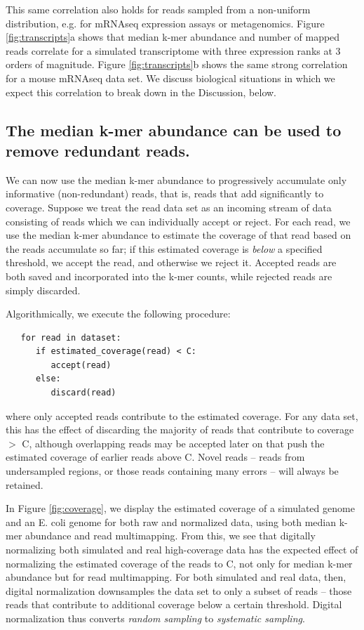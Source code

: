 \documentclass[10pt]{article}
\begin{document}
This same correlation also holds for reads sampled from a non-uniform
distribution, e.g. for mRNAseq expression assays or metagenomics.
Figure \ref{fig:transcripts}a shows that median k-mer abundance and number of mapped reads
correlate for a simulated transcriptome with three expression ranks at 3
orders of magnitude.  Figure \ref{fig:transcripts}b shows the same strong correlation
for a mouse mRNAseq data set.  We discuss biological situations in which
we expect this correlation to break down in the Discussion, below.

\subsection*{The median k-mer abundance can be used to remove redundant reads.}

We can now use the median k-mer abundance to progressively accumulate only
informative (non-redundant) reads, that is, reads that add significantly to 
coverage.  Suppose we treat the
read data set as an incoming stream of data consisting of reads which
we can individually accept or reject.  For each read, we
use the median k-mer abundance to estimate the coverage of that read based on the reads
accumulate so far; if this estimated coverage is {\em below} a specified threshold, we
accept the read, and otherwise we reject it.  Accepted reads are both
saved and incorporated into the k-mer counts, while rejected reads are
simply discarded.

Algorithmically, we execute the following procedure:

\begin{verbatim}
   for read in dataset:
      if estimated_coverage(read) < C:
         accept(read)
      else:
         discard(read)
\end{verbatim}

where only accepted reads contribute to the estimated coverage.  For
any data set, this has the effect of discarding the majority of reads
that contribute to coverage $>$ C, although overlapping reads may be
accepted later on that push the estimated coverage of earlier reads
above C.  Novel reads -- reads from undersampled regions, or those
reads containing many errors -- will always be retained.

In Figure \ref{fig:coverage}, we display the estimated coverage of a simulated genome
and an E. coli genome for both raw and normalized data, using both
median k-mer abundance and read multimapping.  From this, we see that
digitally normalizing both simulated and real high-coverage data has
the expected effect of normalizing the estimated coverage of the reads
to C, not only for median k-mer abundance but for read multimapping.
For both simulated and real data, then, digital normalization
downsamples the data set to only a subset of reads -- those reads that
contribute to additional coverage below a certain threshold.  Digital normalization thus converts {\em
random sampling} to {\em systematic sampling}.
\end{document}
